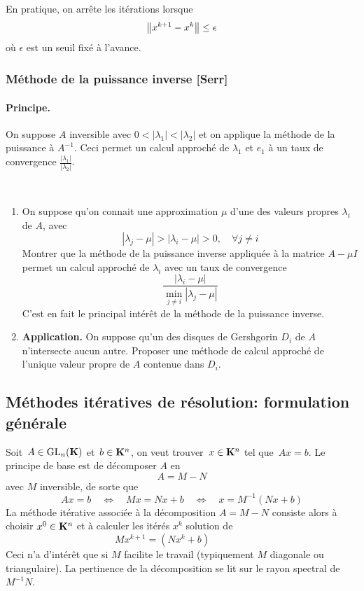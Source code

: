 \begin{remark}
En pratique, on arrête les itérations lorsque
\[
{\left\|x^{k+1}-x^k\right\|} \leq \epsilon
\]
où $\epsilon$ est un seuil fixé à l'avance.
\end{remark}

\subsubsection{Méthode de la puissance inverse [Serr]}

\paragraph*{Principe.}
On suppose $A$ inversible {avec $0 < |\lambda_1| < |\lambda_2|$} et on
applique la méthode de la puissance à $A^{-1}$. Ceci permet un calcul
approché de $\lambda_1$ et $e_1$ à un taux de convergence
$\frac{|\lambda_1|}{|\lambda_2|}$.

\begin{exercice}\label{exo:puissance inverse}$ $
\begin{enumerate}
\item On suppose qu'on connait une approximation $\mu$ d'une des valeurs propres $\lambda_i$ de $A$, avec 
\[
|\lambda_j - \mu | > |\lambda_i - \mu| > 0, \quad \forall j \neq i
\]
Montrer que la méthode de la puissance inverse appliquée à la matrice $A-\mu I$ permet un calcul approché de $\lambda_i$ avec un taux de convergence
\[
\frac{|\lambda_i - \mu|}{\min_{j \neq i}|\lambda_j - \mu|}
\]
C'est en fait le principal intérêt de la méthode de la puissance inverse.
\item \textbf{Application.} On suppose qu'un des disques de Gershgorin $D_i$
de $A$ n'intersecte aucun autre. Proposer une méthode de calcul approché de
l'unique valeur propre de $A$ contenue dans $D_i$.
\end{enumerate}
\end{exercice}

\subsection{Méthodes itératives de résolution: formulation générale}

Soit~$A\in\mathrm{GL}_n(\mathbf{K})$ et~$b\in\mathbf{K}^n$, on veut trouver~$x\in\mathbf{K}^n$ tel
que~$Ax=b$.
Le principe de base est de décomposer $A$ en
\[
A = M - N
\]
avec $M$ inversible, de sorte que
\[
Ax = b \quad \Leftrightarrow \quad Mx = Nx + b \quad \Leftrightarrow \quad x = M^{-1}(Nx+b)
\]
La méthode itérative associée à la décomposition $A = M-N$ consiste alors à
choisir $x^0 \in \mathbf{K}^{n}$ et à calculer les itérés $x^k$ solution de
\[
Mx^{k+1} = (Nx^k + b)
\qquad\qquad
\]
Ceci n'a d'intérêt que si $M$ facilite le travail (typiquement $M$ diagonale ou triangulaire). La pertinence de la décomposition se lit sur le rayon spectral de $M^{-1}N$.

